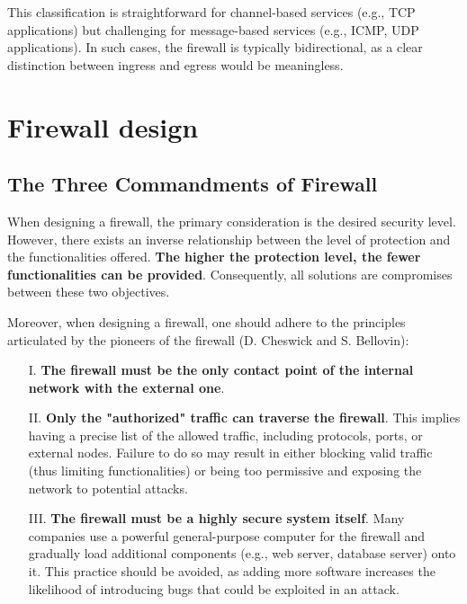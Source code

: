 This classification is straightforward for channel-based services (e.g., TCP applications) but challenging for message-based services (e.g., ICMP, UDP applications). In such cases, the firewall is typically bidirectional, as a clear distinction between ingress and egress would be meaningless.


\section{Firewall design}


\subsection{The Three Commandments of Firewall}
When designing a firewall, the primary consideration is the desired security level. However, there exists an inverse relationship between the level of protection and the functionalities offered. \textbf{The higher the protection level, the fewer functionalities can be provided}.
Consequently, all solutions are compromises between these two objectives.

Moreover, when designing a firewall, one should adhere to the principles articulated by the pioneers of the firewall (D. Cheswick and S. Bellovin):


\begin{itemize}
    \item [I.] \textbf{The firewall must be the only contact point of the internal network with the external one}.
    \item [II.] \textbf{Only the "authorized" traffic can traverse the firewall}. This implies having a precise list of the allowed traffic, including protocols, ports, or external nodes. Failure to do so may result in either blocking valid traffic (thus limiting functionalities) or being too permissive and exposing the network to potential attacks.
    \item [III.] \textbf{The firewall must be a highly secure system itself}. Many companies use a powerful general-purpose computer for the firewall and gradually load additional components (e.g., web server, database server) onto it. This practice should be avoided, as adding more software increases the likelihood of introducing bugs that could be exploited in an attack.
\end{itemize}


